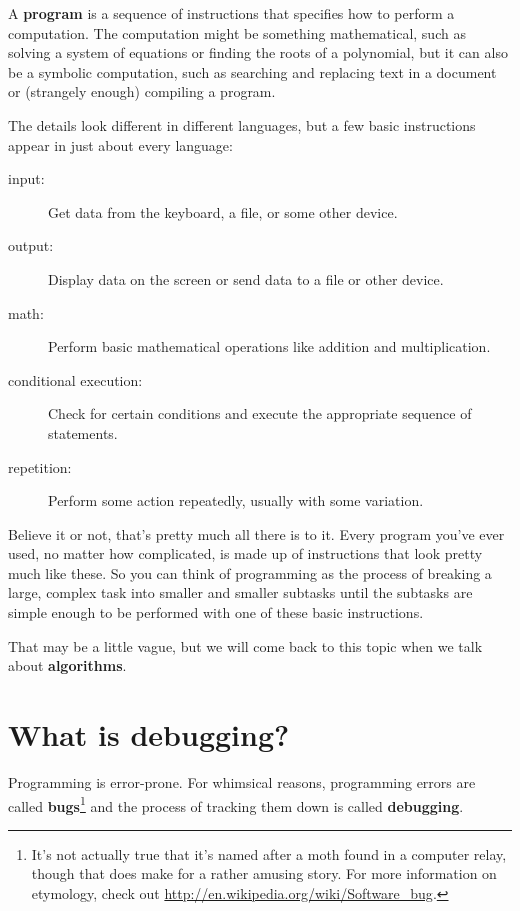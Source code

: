 \documentclass[10pt]{book}
\begin{document}
A {\bf program} is a sequence of instructions that specifies how to perform a computation.  The computation 
might be something mathematical, such as solving a system of equations or finding the roots of a polynomial, 
but it can also be a symbolic computation, such as searching and replacing text in a document or (strangely 
enough) compiling a program.


The details look different in different languages, but a few basic instructions appear in just about every 
language:

\begin{description}

\item[input:] Get data from the keyboard, a file, or some other device.

\item[output:] Display data on the screen or send data to a file or other device.

\item[math:] Perform basic mathematical operations like addition and multiplication.

\item[conditional execution:] Check for certain conditions and execute the appropriate sequence of statements.

\item[repetition:] Perform some action repeatedly, usually with some variation.

\end{description}

Believe it or not, that's pretty much all there is to it.  Every program you've ever used, no matter how 
complicated, is made up of instructions that look pretty much like these.  So you can think of programming 
as the process of breaking a large, complex task into smaller and smaller subtasks until the subtasks are 
simple enough to be performed with one of these basic instructions.


That may be a little vague, but we will come back to this topic when we talk about {\bf algorithms}.

\section{What is debugging?}

Programming is error-prone.  For whimsical reasons, programming errors are called {\bf bugs}\footnote{It's 
not actually true that it's named after a moth found in a computer relay, though that does make for a rather 
amusing story. For more information on etymology, check out \url{http://en.wikipedia.org/wiki/Software_bug}.} 
and the process of tracking them down is called {\bf debugging}.
\end{document}
